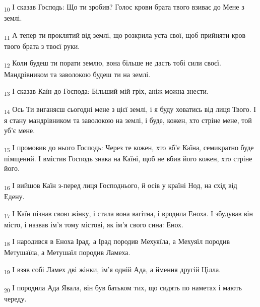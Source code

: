 \begin{tcolorbox}
\textsubscript{10} І сказав Господь: Що ти зробив? Голос крови брата твого взиває до Мене з землі.
\end{tcolorbox}
\begin{tcolorbox}
\textsubscript{11} А тепер ти проклятий від землі, що розкрила уста свої, щоб прийняти кров твого брата з твоєї руки.
\end{tcolorbox}
\begin{tcolorbox}
\textsubscript{12} Коли будеш ти порати землю, вона більше не дасть тобі сили своєї. Мандрівником та заволокою будеш ти на землі.
\end{tcolorbox}
\begin{tcolorbox}
\textsubscript{13} І сказав Каїн до Господа: Більший мій гріх, аніж можна знести.
\end{tcolorbox}
\begin{tcolorbox}
\textsubscript{14} Ось Ти виганяєш сьогодні мене з цієї землі, і я буду ховатись від лиця Твого. І я стану мандрівником та заволокою на землі, і буде, кожен, хто стріне мене, той уб'є мене.
\end{tcolorbox}
\begin{tcolorbox}
\textsubscript{15} І промовив до нього Господь: Через те кожен, хто вб'є Каїна, семикратно буде пімщений. І вмістив Господь знака на Каїні, щоб не вбив його кожен, хто стріне його.
\end{tcolorbox}
\begin{tcolorbox}
\textsubscript{16} І вийшов Каїн з-перед лиця Господнього, й осів у країні Нод, на схід від Едену.
\end{tcolorbox}
\begin{tcolorbox}
\textsubscript{17} І Каїн пізнав свою жінку, і стала вона вагітна, і вродила Еноха. І збудував він місто, і назвав ім'я тому містові, як ім'я свого сина: Енох.
\end{tcolorbox}
\begin{tcolorbox}
\textsubscript{18} І народився в Еноха Ірад, а Ірад породив Мехуяїла, а Мехуяїл породив Метушаїла, а Метушаїл породив Ламеха.
\end{tcolorbox}
\begin{tcolorbox}
\textsubscript{19} І взяв собі Ламех дві жінки, ім'я одній Ада, а ймення другій Цілла.
\end{tcolorbox}
\begin{tcolorbox}
\textsubscript{20} І породила Ада Явала, він був батьком тих, що сидять по наметах і мають череду.
\end{tcolorbox}
